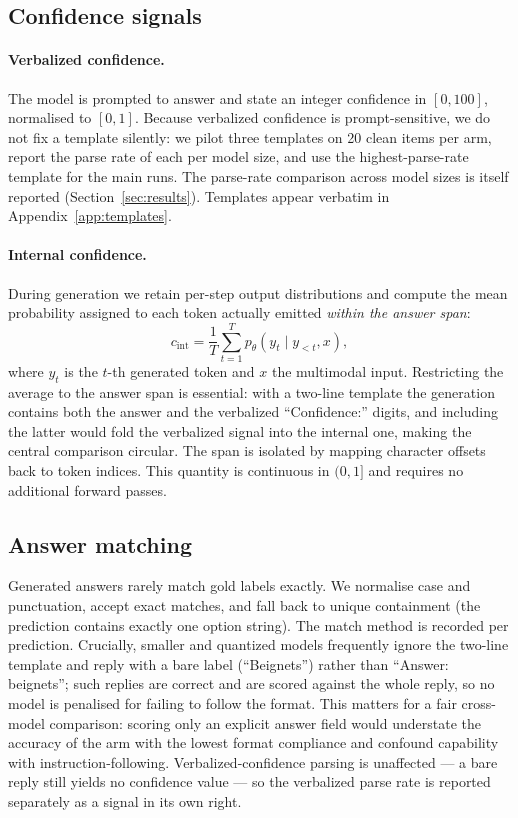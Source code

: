 \documentclass[11pt]{article}
\begin{document}
\subsection{Confidence signals}
\paragraph{Verbalized confidence.}
The model is prompted to answer and state an integer confidence in $[0,100]$,
normalised to $[0,1]$. Because verbalized confidence is prompt-sensitive, we do
not fix a template silently: we pilot three templates on 20 clean items per arm,
report the parse rate of each per model size, and use the highest-parse-rate
template for the main runs. The parse-rate comparison across model sizes is
itself reported (Section~\ref{sec:results}). Templates appear verbatim in
Appendix~\ref{app:templates}.

\paragraph{Internal confidence.}
During generation we retain per-step output distributions and compute the mean
probability assigned to each token actually emitted \emph{within the answer
span}:
\begin{equation}
c_{\text{int}} = \frac{1}{T}\sum_{t=1}^{T} p_\theta\!\left(y_t \mid y_{<t}, x\right),
\end{equation}
where $y_t$ is the $t$-th generated token and $x$ the multimodal input.
Restricting the average to the answer span is essential: with a two-line
template the generation contains both the answer and the verbalized
``Confidence:'' digits, and including the latter would fold the verbalized signal
into the internal one, making the central comparison circular. The span is
isolated by mapping character offsets back to token indices. This quantity is
continuous in $(0,1]$ and requires no additional forward passes.

\subsection{Answer matching}
Generated answers rarely match gold labels exactly. We normalise case and
punctuation, accept exact matches, and fall back to unique containment (the
prediction contains exactly one option string). The match method is recorded per
prediction. Crucially, smaller and quantized models frequently ignore the
two-line template and reply with a bare label (``Beignets'') rather than
``Answer: beignets''; such replies are correct and are scored against the whole
reply, so no model is penalised for failing to follow the format. This matters
for a fair cross-model comparison: scoring only an explicit answer field would
understate the accuracy of the arm with the lowest format compliance and confound
capability with instruction-following. Verbalized-confidence parsing is unaffected
--- a bare reply still yields no confidence value --- so the verbalized parse rate
is reported separately as a signal in its own right.
\end{document}
